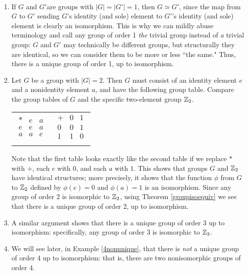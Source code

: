 \begin{example}{}\

\begin{enumerate}
\item If $G$ and $G'$are groups with $|G|=|G'|=1$, then $G\simeq G'$, since the map from $G$ to $G'$ sending $G$'s identity (and sole) element to $G'$'s identity
(and sole) element is clearly an isomorphism.  This is why we can mildly abuse terminology and call any group of order 1 \textit{the} trivial group instead of \textit{a} trivial group: $G$ and
$G'$ may technically be different groups, but structurally they are identical, so we can consider them to be more or less ``the same."  Thus, there is a unique group of order 1, up to isomorphism.

\item Let $G$ be a group with $|G|=2$.  Then $G$ must consist of an identity element $e$ and a nonidentity element $a$, and have the following group table. Compare the group tables of $G$ and the specific two-element group $\mathbb{Z}_2$.

\begin{center}
\begin{tabular}
{lr}
\renewcommand{\arraystretch}{1.3}
$\begin{array}{c||c|c}
*&e&a\\ \hline\hline e&e&a\\ \hline
a&a&e\\
\end{array}$
&
\renewcommand{\arraystretch}{1.3}
$\begin{array}{c||c|c}
+&0&1\\ \hline\hline
0&0&1\\
\hline
1&1&0\\
\end{array}$
\end{tabular}
\end{center}
Note that the first table looks exactly like the second table if we
replace $*$ with $+$, each $e$ with $0$, and each $a$ with $1$. This
shows that groups $G$ and $\mathbb{Z}_2$ have identical structures; more
precisely, it shows that the function $\phi$ from $G$ to $\mathbb{Z}_2$
defined by $\phi(e)=0$ and $\phi(a)=1$ is an isomorphism.  Since any
group of order 2 is isomorphic to $\mathbb{Z}_2$, using Theorem
\ref{groupisoequiv} we see that there is a unique group of order 2,
up to isomorphism.

\item A similar argument shows that there is a unique group of order 3 up to isomorphism: specifically, any group of order 3 is isomorphic to $\mathbb{Z}_3$.

\item We will see later, in Example \ref{4nonunique}, that there is \textit{not} a unique group of order 4 up to isomorphism: that is, there are two nonisomorphic groups of order 4. \end{enumerate}
\end{example}


